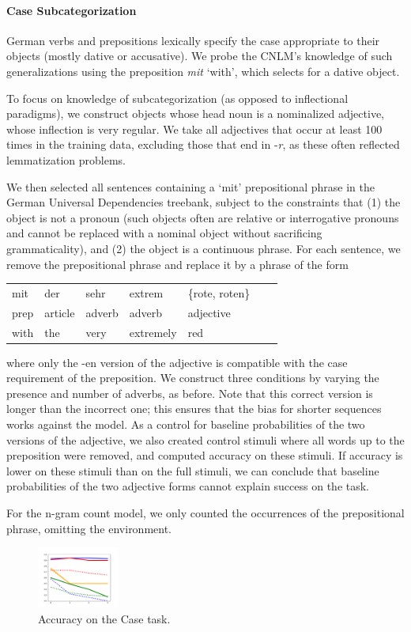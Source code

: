 \paragraph{Case Subcategorization}
German verbs and prepositions lexically specify the case appropriate to their objects (mostly dative or accusative).
We probe the CNLM's knowledge of such generalizations using the preposition \textit{mit} `with', which selects for a dative object.

To focus on knowledge of subcategorization (as opposed to inflectional paradigms), we construct objects whose head noun is a nominalized adjective, whose inflection is very regular.
We take all adjectives that occur at least 100 times in the training data, excluding those that end in -\emph{r}, as these often reflected lemmatization problems.

We then selected all sentences containing a `mit' prepositional phrase in the German Universal Dependencies treebank, subject to the constraints that (1) the object is not a pronoun (such objects often are relative or interrogative pronouns and cannot be replaced with a nominal object without sacrificing grammaticality), and (2) the object is a continuous phrase.
For each sentence, we remove the prepositional phrase and replace it by a phrase of the form
\begin{tabular}{lllllll}
	mit & der & sehr& extrem& \{rote, roten\} \\
	prep & article & adverb & adverb & adjective \\
	with & the & very & extremely & red 
\end{tabular}
where only the -en version of the adjective is compatible with the case requirement of the preposition.
We construct three conditions by varying the presence and number of adverbs, as before.
Note that this correct version is longer than the incorrect one; this ensures that the bias for shorter sequences works against the model.
As a control for baseline probabilities of the two versions of the adjective, we also created control stimuli where all words up to the preposition were removed, and computed accuracy on these stimuli.
If accuracy is lower on these stimuli than on the full stimuli, we can conclude that baseline probabilities of the two adjective forms cannot explain success on the task.

For the n-gram count model, we only counted the occurrences of the prepositional phrase, omitting the environment.

\begin{figure}
\includegraphics[width=0.24\textwidth]{figures/german-prep-with-Control.pdf}
\caption{Accuracy on the Case task.}\label{fig:prep}
\end{figure}

